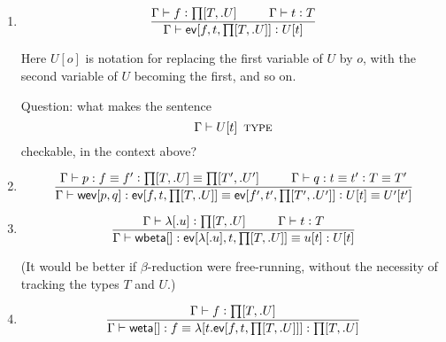 \documentclass[11pt]{article}
\newcommand{\eqd}{\equiv}
\newcommand\spc{{\hskip 26pt}}
\newcommand{\ccolon}{\vcentcolon}
\newcommand{\ccheck}{\vcentcolon}            %
\newcommand{\csynth}{\vcentcolon\vcentcolon} %
\renewcommand{\csynth}{\ccheck}              %
\newcommand{\TYPE}{\mathop{\text{ \sc type}}}
\newcommand{\Okay}{\mathop{\text{ \sc okay}}}
\newcommand{\Context}{\vdash\Okay}
\renewcommand{\Context}{\vdash}
\newcommand{\ha}[2]{#1[#2]}
\newcommand{\weta}{{\sf weta}}
\newcommand{\annot}{{\sf annot}}
\newcommand{\haa}[2]{\ha\annot{#1,#2}}
\renewcommand{\haa}[2]{#1}
\newcommand{\ev}{{\sf ev}}
\newcommand{\wbeta}{{\sf wbeta}}
\newcommand{\weveq}{{\sf wev}}
\newcommand{\var}{\char`_}
\newcommand{\defn}{\vcentcolon\equiv}
\begin{document}
\begin{enumerate}
\item 
\[\frac{
  \Gamma \vdash f \ccheck{\ha\prod{T,.U}}
  \spc 
  \Gamma \vdash t \ccheck{T}
}{
  \Gamma \vdash \ha \ev{f,t,{\ha\prod{T,.U}}} \csynth U[\haa t T] 
}\]

Here $U[o]$ is notation for replacing the first variable of $U$ by $o$, with
the second variable of $U$ becoming the first, and so on.  


Question: what makes the sentence $$\Gamma \vdash U[\haa t T] \TYPE $$
checkable, in the context above?

\item 
\[\frac{
   \Gamma \vdash p : f \eqd f' \ccolon {\ha\prod{T,.U}} \eqd {\ha\prod{T',.U'}} 
   \spc 
   \Gamma \vdash q : t \eqd t' \ccolon T \eqd T'
   }{
   \Gamma \vdash \ha\weveq{p,q} : \ha\ev{f,t,{\ha\prod{T,.U}}} \eqd \ha\ev{f',t',{\ha\prod{T',.U'}}} \ccolon U[\haa t T] \eqd U'[\haa {t'} {T'}]
  }\]

\item 
\[\frac{
  \Gamma \vdash \ha\lambda{.u} \ccheck {\ha\prod{T,.U}}
  \spc
  \Gamma \vdash t \ccheck{T} 
  }{
  \Gamma \vdash \ha\wbeta{} : \ha\ev{\ha\lambda{.u},t,{\ha\prod{T,.U}}} \eqd u[\haa{t}{T}] : U[\haa{t}{T}]
}\]


(It would be better if $\beta$-reduction were free-running, without the
necessity of tracking the types $T$ and $U$.)

\item 
\[
  \frac{\Gamma \vdash f \ccheck{\ha\prod{T,.U}}}
       {\Gamma \vdash \ha\weta{} : f \eqd \ha\lambda{t.\ha\ev{f,t,{\ha\prod{T,.U}}}} : \ha\prod{T,.U}
       }
\]

\end{enumerate}



\end{document}

